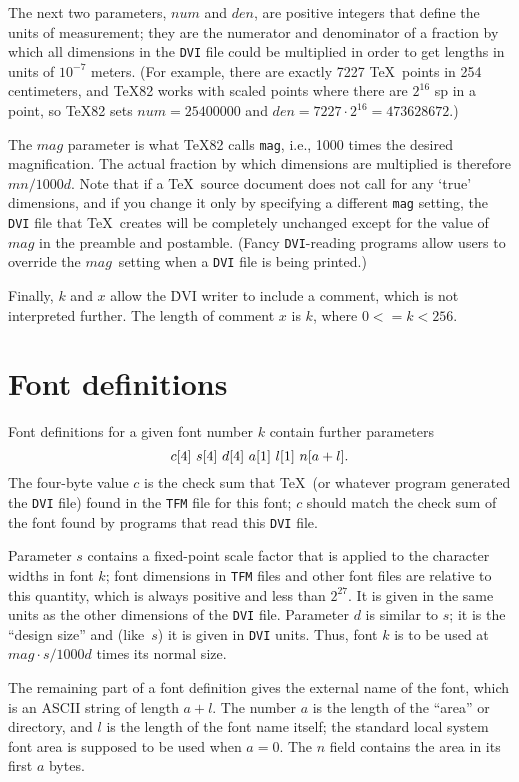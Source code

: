 \documentclass[10pt, a4paper]{article}
\begin{document}
The next two parameters, $num$ and $den$, are positive integers that define
the units of measurement; they are the numerator and denominator of a
fraction by which all dimensions in the \texttt{DVI} file could be multiplied
in order to get lengths in units of $10^{-7}$ meters. (For example, there are
exactly 7227 \TeX\ points in 254 centimeters, and \TeX82 works with scaled
points where there are $2^{16}$ sp in a point, so \TeX82 sets $num=25400000$
and $den=7227\cdot2^{16}=473628672$.)


The $mag$ parameter is what \TeX82 calls \texttt{mag}, i.e., 1000 times the
desired magnification. The actual fraction by which dimensions are
multiplied is therefore $mn/1000d$. Note that if a \TeX\ source document
does not call for any `{true}' dimensions, and if you change it only by
specifying a different \texttt{mag} setting, the \texttt{DVI} file that \TeX\
creates will be completely unchanged except for the value of $mag$ in the
preamble and postamble. (Fancy \texttt{DVI}-reading programs allow users to
override the $mag$~setting when a \texttt{DVI} file is being printed.)

Finally, $k$ and $x$ allow the \.{DVI} writer to include a comment, which is not
interpreted further. The length of comment $x$ is $k$, where $0<=k<256$.


\section{Font definitions}\label{sec:fontDef}

Font definitions for a given font number $k$ contain further parameters
\[
\hbox{$c[4]$ $s[4]$ $d[4]$ $a[1]$ $l[1]$ $n[a+l]$.}
\]
The four-byte value $c$ is the check sum that \TeX\ (or whatever program
generated the \texttt{DVI} file) found in the \texttt{TFM} file for this font;
$c$ should match the check sum of the font found by programs that read
this \texttt{DVI} file.


Parameter $s$ contains a fixed-point scale factor that is applied to the
character widths in font $k$; font dimensions in \texttt{TFM} files and other
font files are relative to this quantity, which is always positive and
less than $2^{27}$. 
It is given in the same units as the other dimensions of the \texttt{DVI} file. 
Parameter $d$ is similar to $s$; it is the ``design size'' 
and (like~$s$) it is given in \texttt{DVI} units. 
Thus, font $k$ is to be used at $mag\cdot s/1000d$ times its normal size.

The remaining part of a font definition gives the external name of the font,
which is an ASCII string of length $a+l$. The number $a$ is the length
of the ``area'' or directory, and $l$ is the length of the font name itself;
the standard local system font area is supposed to be used when $a=0$.
The $n$ field contains the area in its first $a$ bytes.
\end{document}

